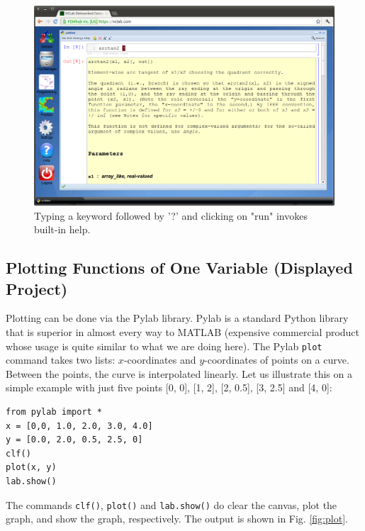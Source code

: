 \documentclass[article,A4,12pt]{llncs}
\begin{document}
\begin{figure}[!ht]
\begin{center}
\includegraphics[width=\textwidth]{img/help.png}
\end{center}
\vspace{-2mm}
\caption{Typing a keyword followed by '?' and clicking on "run" invokes built-in help.}
\label{fig:help}
\end{figure}

\subsection{Plotting Functions of One Variable (Displayed Project)}\label{plotting}

Plotting can be done via the Pylab library. Pylab is a standard Python library that is 
superior in almost every way to MATLAB (expensive commercial product whose usage is 
quite similar to what we are doing here). The Pylab {\tt plot} command takes two
lists: $x$-coordinates and $y$-coordinates of points on a curve. Between the 
points, the curve is interpolated linearly. Let us illustrate this on a simple 
example with just five points [0, 0], [1, 2], [2, 0.5], [3, 2.5] and [4, 0]:

\begin{verbatim}
from pylab import *
x = [0,0, 1.0, 2.0, 3.0, 4.0]
y = [0.0, 2.0, 0.5, 2.5, 0]
clf()
plot(x, y)
lab.show()
\end{verbatim}
\newpage
\noindent
The commands {\tt clf()}, {\tt plot()} and {\tt lab.show()} do clear the canvas, 
plot the graph, and show the graph, respectively.
The output is shown in Fig. \ref{fig:plot}.
\end{document}
